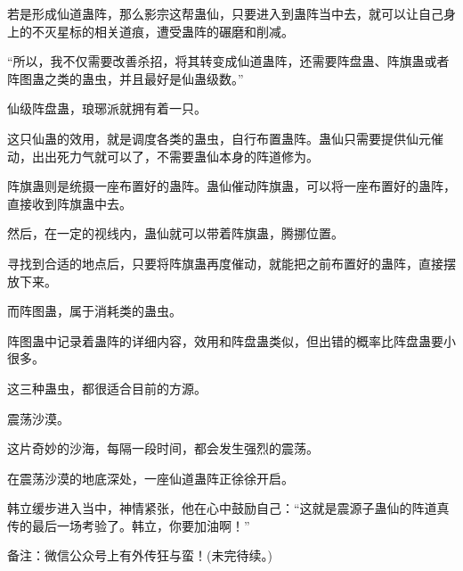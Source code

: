 \begin{this_body}
若是形成仙道蛊阵，那么影宗这帮蛊仙，只要进入到蛊阵当中去，就可以让自己身上的不灭星标的相关道痕，遭受蛊阵的碾磨和削减。

“所以，我不仅需要改善杀招，将其转变成仙道蛊阵，还需要阵盘蛊、阵旗蛊或者阵图蛊之类的蛊虫，并且最好是仙蛊级数。”

仙级阵盘蛊，琅琊派就拥有着一只。

这只仙蛊的效用，就是调度各类的蛊虫，自行布置蛊阵。蛊仙只需要提供仙元催动，出出死力气就可以了，不需要蛊仙本身的阵道修为。

阵旗蛊则是统摄一座布置好的蛊阵。蛊仙催动阵旗蛊，可以将一座布置好的蛊阵，直接收到阵旗蛊中去。

然后，在一定的视线内，蛊仙就可以带着阵旗蛊，腾挪位置。

寻找到合适的地点后，只要将阵旗蛊再度催动，就能把之前布置好的蛊阵，直接摆放下来。

而阵图蛊，属于消耗类的蛊虫。

阵图蛊中记录着蛊阵的详细内容，效用和阵盘蛊类似，但出错的概率比阵盘蛊要小很多。

这三种蛊虫，都很适合目前的方源。

震荡沙漠。

这片奇妙的沙海，每隔一段时间，都会发生强烈的震荡。

在震荡沙漠的地底深处，一座仙道蛊阵正徐徐开启。

韩立缓步进入当中，神情紧张，他在心中鼓励自己：“这就是震源子蛊仙的阵道真传的最后一场考验了。韩立，你要加油啊！”

备注：微信公众号上有外传狂与蛮！(未完待续。)

\end{this_body}

